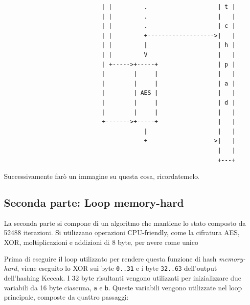 \begin{verbatim}
                            | |         .                    | t |
                            | |         .                    |   |
                            | |         .                    | c |
                            | |         +------------------->|   |
                            | |         |                    | h |
                            | |         V                    |   |
                            | +----->+-----+                 | p |
                            |        |     |                 |   |
                            |        |     |                 | a |
                            |        | AES |                 |   |
                            |        |     |                 | d |
                            |        |     |                 |   |
                            +------->+-----+                 |   |
                                        |                    |   |
                                        +------------------->|   |
                                                             |   |
                                                             +---+
\end{verbatim}

Successivamente farò un immagine su questa cosa, ricordatemelo.

\subsection{Seconda parte: Loop
memory-hard}\label{seconda-parte-loop-memory-hard}

La seconda parte si compone di un algoritmo che mantiene lo stato
composto da 52488 iterazioni. Si utilizzano operazioni
CPU-friendly, come la cifratura AES, XOR, moltiplicazioni e addizioni di
8 byte, per avere come unico

Prima di eseguire il loop utilizzato per rendere questa funzione di hash
\emph{memory-hard}, viene eseguito lo XOR sui byte \texttt{0..31} e i
byte \texttt{32..63} dell'output dell'hashing Keccak. I 32 byte
risultanti vengono utilizzati per inizializzare due variabili da 16 byte
ciascuna, \texttt{a} e \texttt{b}. Queste variabili vengono utilizzate
nel loop principale, composte da quattro passaggi:

